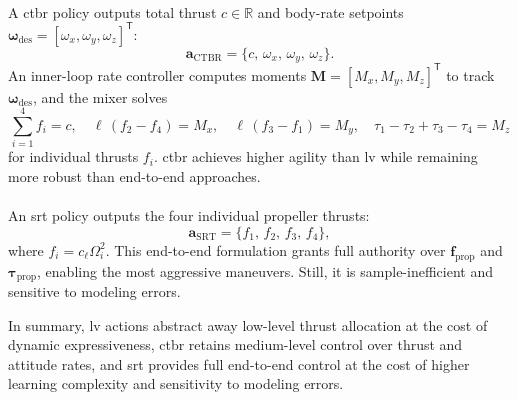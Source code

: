 \paragraph{}  
A \gls{ctbr} policy outputs total thrust \(c\in\mathbb{R}\) and body-rate setpoints \(\boldsymbol{\omega}_{\mathrm{des}}=[\omega_x,\omega_y,\omega_z]^\mathsf{T}\):
\begin{equation}
\mathbf{a}_{\mathrm{CTBR}} = \{c,\,\omega_x,\,\omega_y,\,\omega_z\}.
\end{equation}
An inner-loop rate controller computes moments \(\mathbf{M}=[M_x,M_y,M_z]^\mathsf{T}\) to track \(\boldsymbol{\omega}_{\mathrm{des}}\), and the mixer solves
\begin{equation}
\sum_{i=1}^4 f_i = c, 
\quad
\ell\,(f_2 - f_4) = M_x, 
\quad
\ell\,(f_3 - f_1) = M_y, 
\quad
\tau_1 - \tau_2 + \tau_3 - \tau_4 = M_z
\end{equation}
for individual thrusts \(f_i\). \gls{ctbr} achieves higher agility than \gls{lv} while remaining more robust than end-to-end approaches.

\paragraph{}
An \gls{srt} policy outputs the four individual propeller thrusts:
\begin{equation}
\mathbf{a}_{\mathrm{SRT}} = \{f_1,\,f_2,\,f_3,\,f_4\},
\end{equation}
where \(f_i = c_\ell \Omega_i^2\). This end-to-end formulation grants full authority over \(\mathbf{f}_{\mathrm{prop}}\) and \(\boldsymbol{\tau}_{\mathrm{prop}}\), enabling the most aggressive maneuvers. Still, it is sample-inefficient and sensitive to modeling errors.

In summary, \gls{lv} actions abstract away low-level thrust allocation at the cost of dynamic expressiveness, \gls{ctbr} retains medium-level control over thrust and attitude rates, and \gls{srt} provides full end-to-end control at the cost of higher learning complexity and sensitivity to modeling errors.
